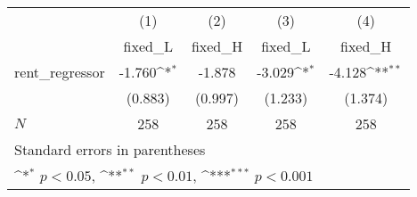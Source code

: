 {
\def\sym#1{\ifmmode^{#1}\else\(^{#1}\)\fi}
\begin{tabular}{l*{4}{c}}
\toprule
            &\multicolumn{1}{c}{(1)}&\multicolumn{1}{c}{(2)}&\multicolumn{1}{c}{(3)}&\multicolumn{1}{c}{(4)}\\
            &\multicolumn{1}{c}{fixed\_L}&\multicolumn{1}{c}{fixed\_H}&\multicolumn{1}{c}{fixed\_L}&\multicolumn{1}{c}{fixed\_H}\\
\midrule
rent\_regressor&      -1.760\sym{*}  &      -1.878         &      -3.029\sym{*}  &      -4.128\sym{**} \\
            &     (0.883)         &     (0.997)         &     (1.233)         &     (1.374)         \\
\midrule
\(N\)       &         258         &         258         &         258         &         258         \\
\bottomrule
\multicolumn{5}{l}{\footnotesize Standard errors in parentheses}\\
\multicolumn{5}{l}{\footnotesize \sym{*} \(p<0.05\), \sym{**} \(p<0.01\), \sym{***} \(p<0.001\)}\\
\end{tabular}
}
